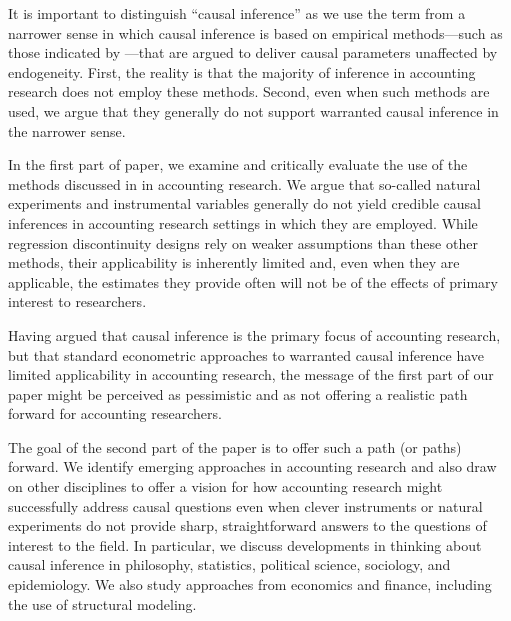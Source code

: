 It is important to distinguish ``causal inference'' as we use the term from a narrower sense in which causal inference is based on empirical methods---such as those indicated by \cite{Angrist:2010jv}---that are argued to deliver causal parameters unaffected by endogeneity.
First, the reality is that the majority of inference in accounting research does not employ these methods.
Second, even when such methods are used, we argue that they generally do not support warranted causal inference in the narrower sense.

In the first part of paper, we examine and critically evaluate the use of the methods discussed in \cite{Angrist:2010jv} in accounting research.
We argue that so-called natural experiments and instrumental variables generally do not yield credible causal inferences in accounting research settings in which they are employed.
While regression discontinuity designs rely on weaker assumptions than these other methods, their applicability is inherently limited and, even when they are applicable, the estimates they provide often will not be of the effects of primary interest to researchers.

Having argued that causal inference is the primary focus of accounting research, but that standard econometric approaches to warranted causal inference have limited applicability in accounting research, the message of the first part of our paper might be perceived as pessimistic and as not offering a realistic path forward for accounting researchers. 

The goal of the second part of the paper is to offer such a path (or paths) forward. 
We identify emerging approaches in accounting research and also draw on other disciplines to offer a vision for how accounting research might successfully address causal questions even when clever instruments or natural experiments do not provide sharp, straightforward answers to the questions of interest to the field.
In particular, we discuss developments in thinking about causal inference in philosophy, statistics, political science, sociology, and epidemiology.
We also study approaches from economics and finance, including the  use of structural modeling.



